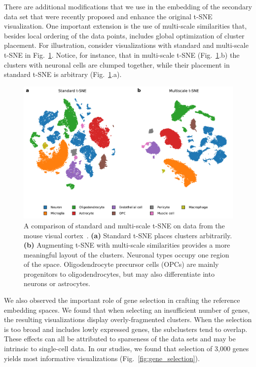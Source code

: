 \documentclass[runningheads]{llncs}
\begin{document}
There are additional modifications that we use in the embedding of the
secondary data set that were recently proposed and enhance the original t-SNE visualization.
One important extension is the use of multi-scale similarities that, besides local ordering of the
data points, includes global optimization of cluster placement. For
illustration, consider visualizations with standard and multi-scale t-SNE in
Fig.~\ref{fig:multiscale}. Notice, for instance, that in multi-scale t-SNE
(Fig.~\ref{fig:multiscale}.b) the clusters with neuronal cells are clumped
together, while their placement in standard t-SNE is arbitrary
(Fig.~\ref{fig:multiscale}.a).


\begin{figure}[htbp]
\includegraphics[width=\textwidth]{figures/hrvatin_multiscale_tsne.pdf}
\caption{A comparison of standard and multi-scale t-SNE on data
from the mouse visual cortex~\cite{hrvatin2018}. {\bf (a)} Standard t-SNE
places clusters arbitrarily. {\bf (b)} Augmenting t-SNE with multi-scale
similarities provides a more meaningful layout of the clusters. Neuronal types
occupy one region of the space. Oligodendrocyte precursor cells (OPCs) are
mainly progenitors to oligodendrocytes, but may also differentiate into neurons
or astrocytes.} \label{fig:multiscale}
\end{figure}

We also observed the important role of gene selection in crafting the
reference embedding spaces. We found that when selecting an insufficient
number of genes, the resulting visualizations display overly-fragmented clusters. When
the selection is too broad and includes lowly expressed genes, the subclusters
tend to overlap. These effects can all be attributed to sparseness of the data
sets and may be intrinsic to single-cell data. In our studies, we found that
selection of 3,000 genes yields most informative visualizations
(Fig.~\ref{fig:gene_selection}).
\end{document}
